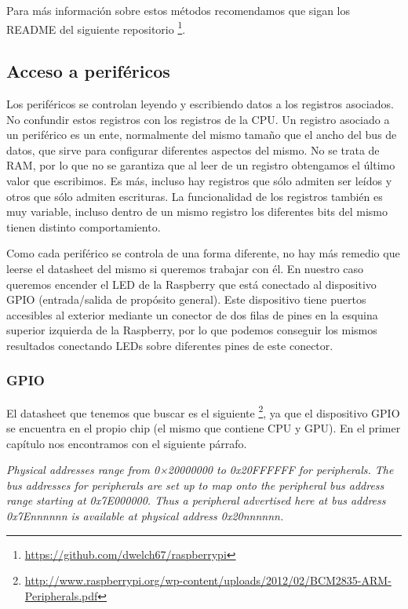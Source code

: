 Para más información sobre estos métodos recomendamos que sigan los
README del siguiente repositorio \footnote{\url{https://github.com/dwelch67/raspberrypi}}.

\subsection{Acceso a periféricos}

Los periféricos se controlan leyendo y escribiendo datos a los registros asociados. No
confundir estos registros con los registros de la CPU. Un registro asociado a un periférico
es un ente, normalmente del mismo tamaño que el ancho del bus de datos, que sirve para
configurar diferentes aspectos del mismo. No se trata de RAM, por lo que no se garantiza que
al leer de un registro obtengamos el último valor que escribimos. Es más, incluso hay
registros que sólo admiten ser leídos y otros que sólo admiten escrituras. La funcionalidad
de los registros también es muy variable, incluso dentro de un mismo registro los diferentes
bits del mismo tienen distinto comportamiento.

Como cada periférico se controla de una forma diferente, no hay más remedio que leerse
el datasheet del mismo si queremos trabajar con él. En nuestro caso queremos encender el LED
de la Raspberry que está conectado al dispositivo GPIO (entrada/salida de propósito general).
Este dispositivo tiene puertos accesibles al exterior mediante un conector de dos filas de
pines en la esquina superior izquierda de la Raspberry, por lo que podemos conseguir los
mismos resultados conectando LEDs sobre diferentes pines de este conector.

\subsubsection{GPIO}

El datasheet que tenemos que buscar es el siguiente
\footnote{\url{http://www.raspberrypi.org/wp-content/uploads/2012/02/BCM2835-ARM-Peripherals.pdf}},
ya que el dispositivo GPIO se encuentra en el propio chip (el mismo que contiene CPU y GPU).
En el primer capítulo nos encontramos con el siguiente párrafo.

{\it Physical addresses range from 0×20000000 to 0x20FFFFFF for peripherals. The bus addresses
for peripherals are set up to map onto the peripheral bus address range starting at
0x7E000000. Thus a peripheral advertised here at bus address 0x7Ennnnnn is available
at physical address 0x20nnnnnn.}

